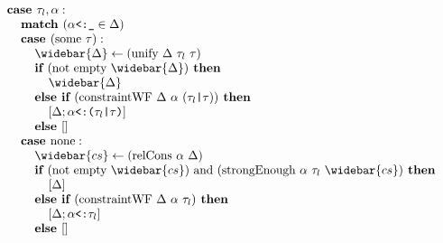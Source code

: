 \documentclass[acmsmall]{acmart}
\begin{document}
\begin{figure*}[h]
\[\begin{array}[t]{@{} l}
\end{array}
\begin{array}[t]{@{} l}
    \I \B{case } \tau_l, \alpha : 
    \\
    \I\I \B{match } (\code{$\alpha$<:\_} \in \Delta)
    \\
    \I\I \B{case } (\F{some } \tau) :
    \\
    \I\I\I \widebar{\Delta} \leftarrow (\F{unify } \Delta\ \tau_l\ \tau)
    \\
    \I\I\I \B{if } (\F{not } \F{empty } \widebar{\Delta}) \B{ then }
    \\
    \I\I\I\I \widebar{\Delta}
    \\
    \I\I\I \B{else if } (\F{constraintWF } \Delta\ \alpha\ (\code{$\tau_l$|$\tau$})) \B{ then }
    \\
    \I\I\I\I [\Delta;\code{$\alpha$<:($\tau_l$|$\tau$)}] 
    \\
    \I\I\I \B{else } [] 
    \\
    \I\I \B{case } \F{none} :
    \\
    \I\I\I \widebar{cs} \leftarrow (\F{relCons } \alpha\ \Delta)  
    \\
    \I\I\I \B{if } (\F{not } \F{empty } \widebar{cs}) \F{ and } 
    (\F{strongEnough } \alpha\ \tau_l\ \widebar{cs}) \B{ then }
    \\
    \I\I\I\I [\Delta]
    \\
    \I\I\I \B{else if } (\F{constraintWF } \Delta\ \alpha\ \tau_l) \B{ then }
    \\
    \I\I\I\I [\Delta;\code{$\alpha$<:$\tau_l$}] 
    \\
    \I\I\I \B{else } []

    \\


\end{array}\]
\end{figure*}
\end{document}
